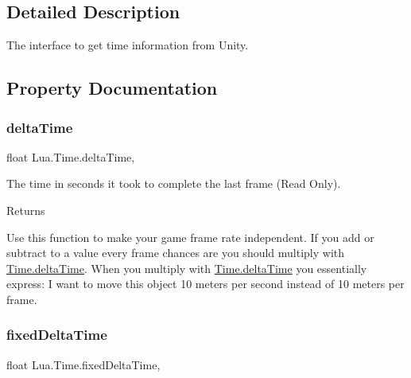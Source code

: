 \subsection{Detailed Description}
The interface to get time information from Unity. 



\subsection{Property Documentation}
\mbox{\label{class_lua_1_1_time_a0c34615f0ecde357e396cab65ecd4428}} 
\subsubsection{\texorpdfstring{deltaTime}{deltaTime}}
{\footnotesize\ttfamily float Lua.\+Time.\+delta\+Time\hspace{0.3cm}{\ttfamily [static]}, {\ttfamily [get]}}



The time in seconds it took to complete the last frame (Read Only). 

\begin{DoxyReturn}{Returns}

\end{DoxyReturn}
Use this function to make your game frame rate independent. If you add or subtract to a value every frame chances are you should multiply with \mbox{\hyperlink{class_lua_1_1_time_a0c34615f0ecde357e396cab65ecd4428}{Time.\+delta\+Time}}. When you multiply with \mbox{\hyperlink{class_lua_1_1_time_a0c34615f0ecde357e396cab65ecd4428}{Time.\+delta\+Time}} you essentially express\+: I want to move this object 10 meters per second instead of 10 meters per frame. \mbox{\label{class_lua_1_1_time_a8b9eb6a7ddf143242c72e6e9378604c6}} 
\subsubsection{\texorpdfstring{fixedDeltaTime}{fixedDeltaTime}}
{\footnotesize\ttfamily float Lua.\+Time.\+fixed\+Delta\+Time\hspace{0.3cm}{\ttfamily [static]}, {\ttfamily [get]}}



